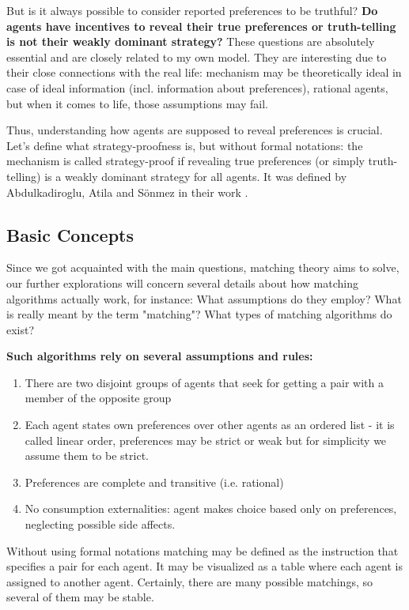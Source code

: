 \documentclass[a4paper]{article} %
\begin{document}
\hfill 
\break
But is it always possible to consider reported preferences to be truthful? 
\textbf{Do agents have incentives to reveal their true preferences or truth-telling is not their weakly dominant strategy?} These questions are absolutely essential and are closely related to my own model. They are interesting due to their close connections with the real life: mechanism may be theoretically ideal in case of ideal information (incl. information about preferences), rational agents, but when it comes to life, those assumptions may fail. 

\hfill 
\break
Thus, understanding how agents are supposed to reveal preferences is crucial. Let's define what strategy-proofness is, but without formal notations: the mechanism is called strategy-proof if revealing true preferences (or simply truth-telling) is a weakly dominant strategy for all agents. It was defined by Abdulkadiroglu, Atila and Sönmez in their work \cite{MainSource}.



\subsection{Basic Concepts}
Since we got acquainted with the main questions, matching theory aims to solve, our further explorations will concern several details about how matching algorithms actually work, for instance: What assumptions do they employ? What is really meant by the term "matching"? What types of matching algorithms do exist?


\hfill 
\break
\textbf{Such algorithms rely on several assumptions and rules:}
\begin{enumerate}
    \item There are two disjoint groups of agents that seek for getting a pair with a member of the opposite group 
    \item Each agent states own preferences over other agents as an ordered list - it is called linear order, preferences may be strict or weak but for simplicity we assume them to be strict. 
    \item Preferences are complete and transitive (i.e. rational) 
    \item No consumption externalities: agent makes choice based only on preferences, neglecting possible side affects. 
\end{enumerate}


\hfill 
\break
Without using formal notations matching may be defined as the instruction that specifies a pair for each agent. It may be visualized as a table where each agent is assigned to another agent. Certainly, there are many possible matchings, so several of them may be stable.
\end{document}

